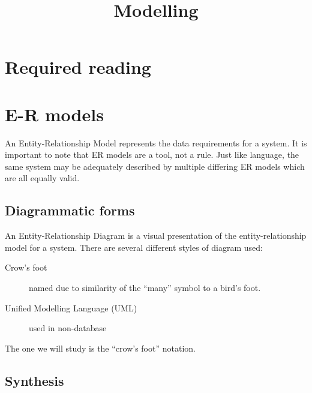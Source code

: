 \documentclass[slides]{pgnotes}
\title{Modelling}
\begin{document}
\maketitle

\section{Required reading}\label{required-reading}


\section{E-R models}\label{e-r-models}

An Entity-Relationship Model represents the data requirements for a
system. It is important to note that ER models are a tool, not a rule.
Just like language, the same system may be adequately described by
multiple differing ER models which are all equally valid.

\subsection{Diagrammatic forms}\label{diagrammatic-forms}

An Entity-Relationship Diagram is a visual presentation of the
entity-relationship model for a system. There are several different
styles of diagram used:

\begin{description}
\item[Crow's foot]
  named due to similarity of the ``many'' symbol to a bird's foot.
\item[Unified Modelling Language (UML)]
  used in non-database
\end{description}

The one we will study is the ``crow's foot'' notation.

\subsection{Synthesis}\label{synthesis}
\end{document}
